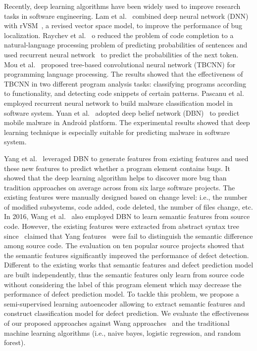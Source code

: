 Recently, deep learning algorithms have been widely used to improve research tasks in software engineering. Lam et al.~\cite{lam2015combining} combined deep neural network (DNN)~\cite{hecht1988theory} with rVSM~\cite{zhou2012should}, a revised vector space model, to improve the performance of bug localization. Raychev et al.~\cite{raychev2014code} o reduced the problem of code completion to a natural-language processing problem of predicting probabilities of sentences and used recurrent neural network~\cite{mikolov2010recurrent} to predict the probabilities of the next token. Mou et al.~\cite{mou2014tbcnn} proposed tree-based convolutional neural network (TBCNN) for programming language processing. The results showed that the effectiveness of TBCNN  in two different program analysis tasks: classifying programs according to functionality, and detecting code snippets of certain patterns. Pascanu et al.~\cite{pascanu2015malware} employed recurrent neural network to build malware classification model in software system. Yuan et al.~\cite{yuan2014droid} adopted deep belief network (DBN)~\cite{hinton2009deep} to predict mobile malware in Android platform. The experimental results showed that deep learning technique is especially suitable for predicting malware in software system. 

Yang et al.~\cite{yang2015deep} leveraged DBN to generate features from existing features and used these new features to predict whether a program element contains bugs. It showed that the deep learning algorithm helps to discover more bug than tradition approaches on average across from six large software projects. The existing features were manually designed based on change level: i.e., the number of modified subsystems, code added, code deleted, the number of files change, etc. In 2016, Wang et al.~\cite{wang2016automatically} also employed DBN to learn semantic features from source code. However, the existing features were extracted from abstract syntax tree since~\cite{wang2012compressed} claimed that Yang features~\cite{yang2015deep} were fail to distinguish the semantic difference among source code. The evaluation on ten popular source projects showed that the semantic features significantly improved the performance of defect detection. Different to the existing works that semantic features and defect prediction model are built independently, thus the semantic features only learn from source code without considering the label of this program element which may decrease the performance of defect prediction model. To tackle this problem, we propose a semi-supervised learning autoencoder allowing to extract semantic features and construct classification model for defect prediction. We evaluate the effectiveness of our proposed approaches against Wang approaches~\cite{wang2012compressed} and the traditional machine learning algorithms (i.e., naive bayes, logistic regression, and random forest).

